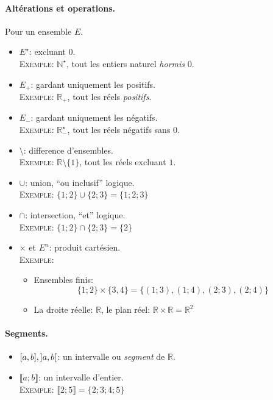 \documentclass{article}
\newcommand{\iinterval}[2]{\llbracket #1; #2 \rrbracket}
\newcommand{\setf}[1]{\{#1 \}}
\newcommand{\Ex}{\textsc{Exemple}: }
\begin{document}
\paragraph{Altérations et operations.} 
Pour un ensemble $E$.
\begin{itemize}
    \item $E^{\star}$: excluant $0$. \\
        \Ex $\mathbb{N}^{\star}$, tout les entiers naturel 
        \textit{hormis} $0$.
    \item $E_{+}$: gardant uniquement les positifs. \\
        \Ex $\mathbb{R}_{+}$, tout les réels \textit{positifs}.
    \item $E_{-}$: gardant uniquement les négatifs. \\
        \Ex $\mathbb{R}^{\star}_{-}$, tout les réels négatifs sans $0$.
    
    \item $\setminus$: difference d'ensembles. \\
        \Ex $\mathbb{R} \setminus \{1\}$, tout les réels excluant $1$.
    \item $\cup$: union, \enquote{ou inclusif} logique. \\
        \Ex $\{1; 2\} \cup \{2; 3\} = \{1; 2; 3\}$
    \item $\cap$: intersection, \enquote{et} logique. \\
        \Ex $\{1; 2\} \cap \{2; 3\} = \{2\}$
    \item $\times$ et $E^{n}$: produit cartésien. \\
        \Ex \begin{itemize}
            \item Ensembles finis: $$
                \setf{1; 2} \times \setf{3, 4} 
              = \setf{(1; 3), (1; 4), (2; 3), (2; 4)}
            $$
            \item La droite réelle: $\mathbb{R}$,
                le plan réel: $\mathbb{R} \times \mathbb{R} = \mathbb{R}^2$
        \end{itemize}
\end{itemize}

\paragraph{Segments.} 

\begin{itemize}
    \item $\interval{a}{b}, \interval[open]{a}{b}$: 
        un intervalle ou \textit{segment} de $\mathbb{R}$.
    \item $\iinterval{a}{b}$: un intervalle d'entier. \\
        \Ex $\iinterval{2}{5} = \setf{2; 3; 4; 5}$
\end{itemize}
\end{document}
